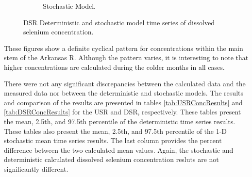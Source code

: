 \begin{linenumbers}
\begin{landscape}
\begin{figure}
\begin{subfigure}{0.7\textwidth}
			\caption{Stochastic Model.}
		\end{subfigure}
		\caption{DSR Deterministic and stochastic model time series of dissolved selenium concentration.}
	\end{figure}
\end{landscape}
\subfiguretop

These figures show a definite cyclical pattern for concentrations within the main stem of the Arkansas R.  Although the pattern varies, it is interesting to note that higher concentrations are calculated during the colder months in all cases.

There were not any significant discrepancies between the calculated data and the measured data nor between the deterministic and stochastic models.  The results and comparison of the results are presented in tables \ref{tab:USRConcResults} and \ref{tab:DSRConcResults} for the USR and DSR, respectively.  These tables present the mean, 2.5th, and 97.5th percentile of the deterministic time series results.  These tables also present the mean, 2.5th, and 97.5th percentile of the 1-D stochastic mean time series results.  The last column provides the percent difference between the two calculated mean values.  Again, the stochastic and deterministic calculated dissolved selenium concentration resluts are not significantly different.

\subtabletop
\begin{table}[htbp]
	\centering
  \caption[USR dissolved selenium concentration results table.]{USR dissolved selenium concentration results table.  Values are in units of \si{\micro\gram\per\liter}.}
	\label{tab:USRConcResults}
	\begin{subtable}{\textwidth}
		\centering
		
	\end{subtable}\\
	\tablevspace
	\begin{subtable}{\textwidth}
		\centering
		
	\end{subtable}\\
\end{table}


\end{linenumbers}
